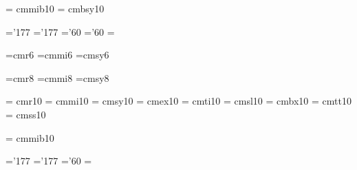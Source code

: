   \font\ten@mib@ = cmmib10   \@halfmag  %
  \font\ten@syb@ = cmbsy10   \@halfmag  %
 
\skewchar\ten@mi@ ='177      %
\skewchar\ten@mib@ ='177     %
\skewchar\ten@sy@ ='60       %
\skewchar\ten@syb@ ='60      %
\hyphenchar\ten@tt@ = \m@ne  %
 
 
  \font\six@rm@V=cmr6           %
  \font\six@mi@V=cmmi6          %
  \font\six@sy@V=cmsy6          %
 
 
  \font\eight@rm@V=cmr8         %
  \font\eight@mi@V=cmmi8        %
  \font\eight@sy@V=cmsy8        %
 
 
  \font\ten@rm@V = cmr10        %
  \font\ten@mi@V = cmmi10       %
  \font\ten@sy@V = cmsy10       %
  \font\ten@ex@V = cmex10       %
  \font\ten@it@V = cmti10       %
  \font\ten@sl@V = cmsl10       %
  \font\ten@bf@V = cmbx10       %
  \font\ten@tt@V = cmtt10       %
  \font\ten@ss@V = cmss10       %
 
  \font\ten@mib@V = cmmib10     %
 
\skewchar\ten@mi@V ='177      %
\skewchar\ten@mib@V ='177     %
\skewchar\ten@sy@V ='60       %
\hyphenchar\ten@tt@V = \m@ne  %
 
